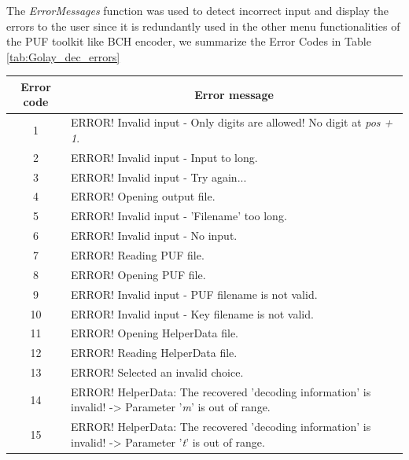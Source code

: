 	The \emph{ErrorMessages} function was used to detect incorrect input and display the errors to the user since it is redundantly used in the other menu functionalities of the PUF toolkit like BCH encoder, we summarize the Error Codes in Table \ref{tab:Golay_dec_errors}

	\begin{table}[!ht]
	\begin{center}
	\begin{tabular}{cp{13cm}}
	\toprule
	\multicolumn{1}{c}{\textbf{Error code}} & \multicolumn{1}{c}{\textbf{Error message}} \\
	\midrule
	\hline
	1 & ERROR! Invalid input - Only digits are allowed! No digit at \emph{pos + 1}.\\

	2 & ERROR! Invalid input - Input to long. \\

	3 & ERROR! Invalid input - Try again...  \\

	4 & ERROR! Opening output file. \\

	5 & ERROR! Invalid input - 'Filename' too long. \\

	6 & ERROR! Invalid input - No input. \\

	7 & ERROR! Reading PUF file. \\

	8 & ERROR! Opening PUF file. \\

	9 & ERROR! Invalid input - PUF filename is not valid.\\

	10 & ERROR! Invalid input - Key filename is not valid.\\

	11 & ERROR! Opening HelperData file. \\

	12 & ERROR! Reading HelperData file. \\

	13 & ERROR! Selected an invalid choice. \\

	14 & ERROR! HelperData: The recovered 'decoding information' is invalid! -> Parameter '\emph{m}' is out of range.\\

	15 & ERROR! HelperData: The recovered 'decoding information' is invalid! -> Parameter '\emph{t}' is out of range.\\


\end{tabular}
\end{center}
\end{table}
